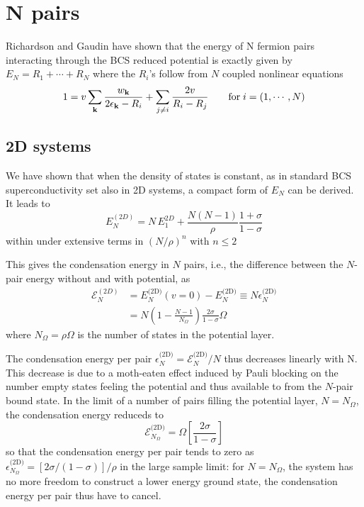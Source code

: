 \documentclass{article}
\newcommand{\td}{{\ensuremath{{\text{(2D)}}}}}
\begin{document}
\section{N pairs\label{sec:NPair}}
Richardson \cite{Richardson1} and Gaudin \cite{gaudin} have shown that the energy of N fermion pairs interacting through the BCS reduced potential is exactly given by $E_N=R_1+\cdots+R_N$ where the $R_i$'s follow from $N$ coupled nonlinear equations
\begin{equation}
 1=v\sum_{\mathbf{k}}\frac{w_{\mathbf{k}}}{2\epsilon_{\mathbf{k}}-R_i}+\sum_{j\neq{}i}\frac{2v}{R_i-R_j}\qquad\text{for}\;i=(1,\cdots,N)
\end{equation}
\subsection{2D systems}
We have shown that when the density of states is constant, as in standard BCS superconductivity set also in 2D systems, a compact form of $E_N$ can be derived. It leads to 
\begin{equation}
 E^(2D)_N=N\,E^{2D}_1+\frac{N(N-1)}{\rho}\frac{1+\sigma}{1-\sigma}
\end{equation}
within under extensive terms in $(N/\rho)^n$ with $n\leq2$

This gives the condensation energy in $N$ pairs, i.e., the difference between the $N$-pair energy without and with potential, as 
\begin{equation}\label{eq:E2D}
\begin{split}
 \mathcal{E}^{(2D)}_N&=E_N^{\td}(v=0)-E_N^\td\equiv{}N\epsilon_N^\td\\
&=N(1-\frac{N-1}{N_\Omega})\frac{2\sigma}{1-\sigma}\Omega
\end{split}
\end{equation}
where $N_\Omega=\rho\Omega$ is the number of states in the potential layer. 

The condensation energy per pair $\epsilon^\td_N=\mathcal{E}^\td_N/N$ thus decreases linearly with N. This decrease is due to a moth-eaten effect induced by Pauli blocking on the number empty states feeling the potential and thus available to from the $N$-pair bound state.  In the limit of a number of pairs filling the potential layer, $N=N_\Omega$, the condensation energy reduceds to 
\begin{equation}
 \mathcal{E}^\td_{N_\Omega}=\Omega[\frac{2\sigma}{1-\sigma}]
\end{equation}
so that the condensation energy per pair tends to zero as $\epsilon^\td_{N_\Omega}=[2\sigma/(1-\sigma)]/\rho$ in the large sample limit: for $N=N_\Omega$, the system has no more freedom to construct a lower energy ground state, the condensation energy per pair thus have to cancel.  
\end{document}
